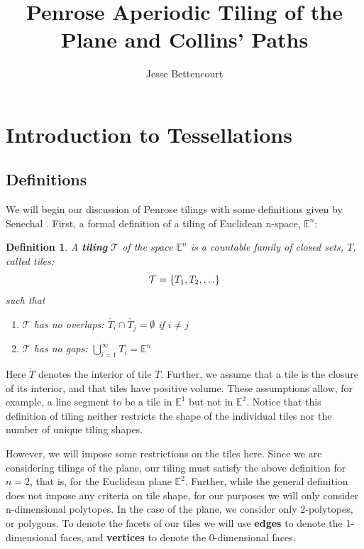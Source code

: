 \documentclass[]{article}
\title{Penrose Aperiodic Tiling of the Plane and Collins' Paths}
\author{Jesse Bettencourt}
\newtheorem{mydef}{Definition}
\begin{document}
\maketitle

\section{Introduction to Tessellations}
\subsection{Definitions}
We will begin our discussion of Penrose tilings with some definitions given by Senechal \cite{Senechal1996}. First, a formal definition of a tiling of Euclidean n-space, $\mathbb{E}^n$:



\begin{mydef}
A \textbf{tiling} $\mathcal{T}$ of the space $\mathbb{E}^n$ is a countable family of closed sets, $T$, called tiles:
\begin{equation*}
\mathcal{T}=\{T_1,T_2,\mathellipsis\}
\end{equation*}
such that
\begin{enumerate}
\item $\mathcal{T}$ has no overlaps: $\mathring{T_i} \cap \mathring{T_j}=\emptyset$ if $i\neq j$
\item $\mathcal{T}$ has no gaps: $\bigcup_{i=1}^\infty T_i = \mathbb{E}^n$
\end{enumerate}
\end{mydef}


Here $\mathring{T}$ denotes the interior of tile $T$. Further, we assume that a tile is the closure of its interior, and that tiles have positive volume. These assumptions allow, for example, a line segment to be a tile in $\mathbb{E}^1$ but not in $\mathbb{E}^2$. Notice that this definition of tiling neither restricts the shape of the individual tiles nor the number of unique tiling shapes.  

However, we will impose some restrictions on the tiles here. Since we are considering tilings of the plane, our tiling must satisfy the above definition for $n=2$, that is, for the Euclidean plane $\mathbb{E}^2$. Further, while the general definition does not impose any criteria on tile shape, for our purposes we will only consider n-dimensional polytopes. In the case of the plane, we consider only 2-polytopes, or polygons. To denote the facets of our tiles we will use \textbf{edges} to denote the 1-dimensional faces, and \textbf{vertices} to denote the 0-dimensional faces. 
\end{document}
